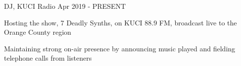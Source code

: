 
\begin {cventries}
  \cventry
    {DJ, KUCI}
    {Radio}
    {}
    {Apr 2019 - PRESENT}
    {
      \begin{cvitems}
        \item {Hosting the show, 7 Deadly Synths, on KUCI 88.9 FM, broadcast live to the Orange County region}
        \item {Maintaining strong on-air presence by announcing music played and fielding telephone calls from listeners}
      \end{cvitems}
    }
\end{cventries}
